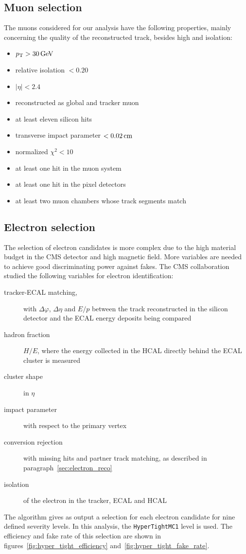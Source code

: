 \subsection{Muon selection}
The muons considered for our analysis have the following properties, mainly
concerning the quality of the reconstructed track, besides high \pt and
isolation:
\begin{itemize}
    \item $\pt > \unit[30]{GeV}$
    \item relative isolation $< 0.20$
    \item $|\eta| < 2.4$
    \item reconstructed as global and tracker muon
    \item at least eleven silicon hits
    \item transverse impact parameter $< \unit[0.02]{cm}$
    \item normalized $\chi^2 < 10$
    \item at least one hit in the muon system
    \item at least one hit in the pixel detectors
    \item at least two muon chambers whose track segments match
\end{itemize}

\subsection{Electron selection}
The selection of electron candidates is more complex due to the high
material budget in the CMS detector and high magnetic field. More variables are
needed to achieve good discriminating power against fakes.
The CMS collaboration studied the following variables for electron
identification:
\begin{description}
    \item[tracker-ECAL matching,] with $\Delta \varphi$, $\Delta \eta$ and
        $E/p$ between the track reconstructed in the silicon detector and
        the ECAL energy deposits being compared
    \item[hadron fraction] $H/E$, where the energy collected in the HCAL
        directly behind the ECAL cluster is measured
    \item[cluster shape] in $\eta$
    \item[impact parameter]  with respect to the primary vertex
    \item[conversion rejection] with missing hits and partner track
        matching, as described in paragraph~\ref{sec:electron_reco}
    \item[isolation] of the electron in the tracker, ECAL and HCAL
\end{description}
The algorithm gives as output a selection for each electron candidate for
nine defined severity levels. In this analysis, the \texttt{HyperTightMC1}
level is used. The efficiency and fake rate of this selection are shown in
figures~\ref{fig:hyper_tight_efficiency}
and~\ref{fig:hyper_tight_fake_rate}.

